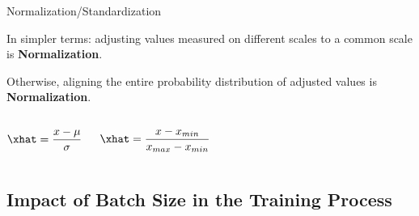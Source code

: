 \documentclass[aspectratio=169,xcolor=dvipsnames,svgnames,x11names,fleqn]{beamer}
\begin{document}
\begin{frame}{Normalization/Standardization}

\begin{tcolorbox}[title=Definition, colframe=pink, colback=NavajoWhite1]
In simpler terms: adjusting values measured on different scales to a common scale is \textbf{Normalization}.

\bigskip

Otherwise, aligning the entire probability distribution of adjusted values is \textbf{Normalization}.


\end{tcolorbox}


\begin{columns}

    \begin{tcolorbox}[colframe=lightblue, title=Standard Normalization]
        \begin{align*}
            \xhat = \frac{x - \mu}{\sigma}
        \end{align*}
    \end{tcolorbox}


    \begin{tcolorbox}[colframe=Green!60, title=Minmax Normalization]
        \begin{align*}
            \xhat = \frac{x - x_{min}}{ x_{max} -  x_{min}}
        \end{align*}
    \end{tcolorbox}
    
\end{columns}


\end{frame}


\subsection{Impact of Batch Size in the Training Process}

\begin{frame}
    \subsectionpage
\end{frame}
\end{document}
